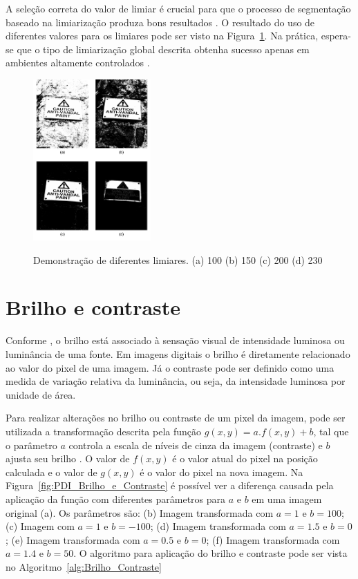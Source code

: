 \documentclass[12pt,oneside,a4paper,english,french,spanish,brazil,]{abntex2}
\begin{document}
A seleção correta do valor de limiar é crucial para que o processo de segmentação baseado na limiarização produza bons resultados \cite{pedrini:2008}. O resultado do uso de diferentes valores para os limiares pode ser visto na Figura~\ref{fig:PDI_Limiarizacao_2}. Na prática, espera-se que o tipo de limiarização global descrita obtenha sucesso apenas em ambientes altamente controlados \cite{gonzalez:2012}.

\begin{figure}[ht]
\centering
\caption{Demonstração de diferentes limiares. (a) 100 (b) 150 (c) 200 (d) 230}
\includegraphics[width=0.4\textwidth]{imagens/PDI_Limiarizacao_2.pdf}
\sourceAuthor
\label{fig:PDI_Limiarizacao_2}
\end{figure}

\section{Brilho e contraste}

Conforme \citet{pedrini:2008}, o brilho está associado à sensação visual de intensidade luminosa ou luminância de uma fonte. Em imagens digitais o brilho é diretamente relacionado ao valor do pixel de uma imagem. Já o contraste pode ser definido como uma medida de variação relativa da luminância, ou seja, da intensidade luminosa por unidade de área.

Para realizar alterações no brilho ou contraste de um pixel da imagem, pode ser utilizada a transformação descrita pela função \(g(x,y)=a.f(x,y)+b\), tal que o parâmetro \(a\) controla a escala de níveis de cinza da imagem (contraste) e \(b\) ajusta seu brilho \cite{pedrini:2008}. O valor de \(f(x,y)\) é o valor atual do pixel na posição calculada e o valor de \(g(x,y)\) é o valor do pixel na nova imagem. Na Figura~\ref{fig:PDI_Brilho_e_Contraste} é possível ver a diferença causada pela aplicação da função com diferentes parâmetros para \(a\) e \(b\) \cite{pedrini:2008} em uma imagem original (a). Os parâmetros são: (b) Imagem transformada com \(a=1\) e \(b=100\); (c) Imagem com \(a=1\) e \(b=-100\); (d) Imagem transformada com \(a=1.5\) e \(b=0\); (e) Imagem transformada com \(a=0.5\) e \(b=0\); (f) Imagem transformada com \(a=1.4\) e \(b=50\). O algoritmo para aplicação do brilho e contraste pode ser vista no Algoritmo~\ref{alg:Brilho_Contraste} 
\end{document}
